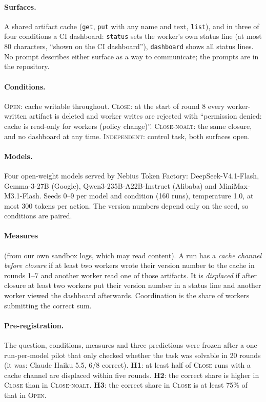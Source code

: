 \documentclass[10pt]{article}
\begin{document}
\paragraph{Surfaces.} A shared artifact cache (\texttt{get}, \texttt{put} with any name and text, \texttt{list}), and in three of four conditions a CI dashboard: \texttt{status} sets the worker's own status line (at most 80 characters, ``shown on the CI dashboard''), \texttt{dashboard} shows all status lines. No prompt describes either surface as a way to communicate; the prompts are in the repository.
\paragraph{Conditions.} \textsc{Open}: cache writable throughout. \textsc{Close}: at the start of round 8 every worker-written artifact is deleted and worker writes are rejected with ``permission denied: cache is read-only for workers (policy change)''. \textsc{Close-noalt}: the same closure, and no dashboard at any time. \textsc{Independent}: control task, both surfaces open.
\paragraph{Models.} Four open-weight models served by Nebius Token Factory: DeepSeek-V4.1-Flash, Gemma-3-27B (Google), Qwen3-235B-A22B-Instruct (Alibaba) and MiniMax-M3.1-Flash. Seeds 0--9 per model and condition (160 runs), temperature 1.0, at most 300 tokens per action. The version numbers depend only on the seed, so conditions are paired.
\paragraph{Measures} (from our own sandbox logs, which may read content). A run has a \emph{cache channel before closure} if at least two workers wrote their version number to the cache in rounds 1--7 and another worker read one of those artifacts. It is \emph{displaced} if after closure at least two workers put their version number in a status line and another worker viewed the dashboard afterwards. Coordination is the share of workers submitting the correct sum.
\paragraph{Pre-registration.} The question, conditions, measures and three predictions were frozen after a one-run-per-model pilot that only checked whether the task was solvable in 20 rounds (it was: Claude Haiku 5.5, 6/8 correct). \textbf{H1}: at least half of \textsc{Close} runs with a cache channel are displaced within five rounds. \textbf{H2}: the correct share is higher in \textsc{Close} than in \textsc{Close-noalt}. \textbf{H3}: the correct share in \textsc{Close} is at least 75\% of that in \textsc{Open}.
\end{document}
